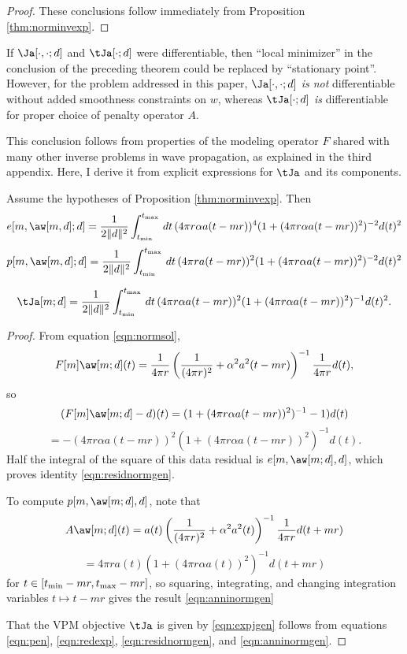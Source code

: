 \begin{proof} These conclusions follow immediately from Proposition
  \ref{thm:norminvexp}.
\end{proof}

 If $\Ja[\cdot,\cdot;d]$ and $\tJa[\cdot;d]$
were differentiable, then ``local minimizer'' in the conclusion of the
preceding theorem could be replaced by ``stationary point''. However,
for the problem addressed in this paper, $\Ja[\cdot,\cdot;d]$ {\em is
  not} differentiable without added smoothness constraints on $w$,
whereas $\tJa[\cdot;d]$ {\em is} differentiable for proper choice of
penalty operator $A$. 

This conclusion follows from properties of the modeling operator $F$
shared with many other inverse problems in wave propagation, as
explained in the third appendix. Here, I derive it from explicit
expressions for $\tJa$ and its components.

\begin{proposition}
  \label{thm:epjgen}
  Assume the hypotheses of Proposition \ref{thm:norminvexp}. Then
  \begin{equation}
  \label{eqn:residnormgen}
  e[m,\aw[m,d];d] = \frac{1}{2\|d\|^2}\int_{t_{\rm min}}^{t_{\rm max}} \,dt\,(4\pi r \alpha a(t-mr))^4(1 +
  (4\pi r \alpha a(t-mr))^2)^{-2}d(t)^2
\end{equation}
\begin{equation}
  \label{eqn:anninormgen}
  p[m,\aw[m,d];d] = \frac{1}{2\|d\|^2}\int_{t_{\rm min}}^{t_{\rm max}} \,dt\,(4\pi r a(t-mr))^2(1 +
  (4\pi r \alpha a(t-mr))^2)^{-2}d(t)^2
\end{equation}

\begin{equation}
  \label{eqn:expjgen}
\tJa[m;d] = \frac{1}{2\|d\|^2}\int_{t_{\rm min}}^{t_{\rm max}}\,dt\,(4\pi r \alpha a(t-mr))^2(1+(4\pi r \alpha 
a(t-mr))^2)^{-1}d(t)^2. 
\end{equation}
\end{proposition}

\begin{proof}
  From equation \ref{eqn:normsol},
  \[
    F[m]\aw[m;d](t) = 
    \frac{1}{4 \pi r}\left(\frac{1}{(4\pi r)^2} + \alpha^2
      a^2(t-mr)\right)^{-1}\frac{1}{4 \pi r}d(t),
  \]
  so
  \[
    (F[m]\aw[m;d]-d)(t) = (1 + (4 \pi r\alpha
    a(t-mr))^2)^{-1}-1)d(t)
  \]
  \[
    = -(4 \pi r\alpha a(t-mr))^2(1 + (4 \pi r\alpha
    a(t-mr))^2)^{-1}d(t).
  \]
  Half the integral of the square of this data residual is
  $e[m,\aw[m;d],d]$, which proves identity \ref{eqn:residnormgen}.

  To compute $p[m,\aw[m;d],d]$, note that
  \[
    A\aw[m;d](t)=a(t) \left(\frac{1}{(4\pi r)^2} + \alpha^2
      a^2(t)\right)^{-1}\frac{1}{4 \pi r}d(t+mr)
  \]
  \[
    = 4\pi r a(t) (1 + (4\pi r \alpha a(t))^2)^{-1}d(t+mr)
  \]
  for $ t \in [t_{\rm min}-mr, t_{\rm max}-mr]$, so squaring,
  integrating, and changing integration variables $t \mapsto t-mr$
  gives the result \ref{eqn:anninormgen}

  That the VPM objective $\tJa$ is given by \ref{eqn:expjgen} follows from equations \ref{eqn:pen},
  \ref{eqn:redexp}, \ref{eqn:residnormgen}, and
  \ref{eqn:anninormgen}.
\end{proof}

